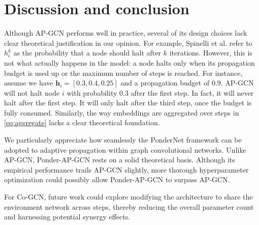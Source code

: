 \documentclass{gdl}
\begin{document}
\section{Discussion and conclusion}
Although AP-GCN performs well in practice, several of its design choices lack clear theoretical justification in our opinion. For example, Spinelli et al. refer to $h_i^k$ as the probability that a node should halt after $k$ iterations. However, this is not what actually happens in the model: a node halts only when its propagation budget is used up or the maximum number of steps is reached. For instance, assume we have $\mathbf{h}_i = [0.3, 0.4, 0.25]$ and a propagation budget of $0.9$. AP-GCN will not halt node $i$ with probability $0.3$ after the first step. In fact, it will never halt after the first step. It will only halt after the third step, once the budget is fully consumed. Similarly, the way embeddings are aggregated over steps in \autoref{eq:aggregate} lacks a clear theoretical foundation.

We particularly appreciate how seamlessly the PonderNet framework can be adopted to adaptive propagation within graph convolutional networks. Unlike AP-GCN, Ponder-AP-GCN rests on a solid theoretical basis. Although its empirical performance trails AP-GCN slightly, more thorough hyperparameter optimization could possibly allow Ponder-AP-GCN to surpass AP-GCN.

For Co-GCN, future work could explore modifying the architecture to share the environment network across steps, thereby reducing the overall parameter count and harnessing potential synergy effects.
\end{document}
